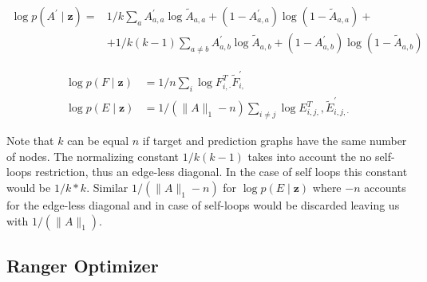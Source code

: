 {\begin{equation}
    \begin{split}
        \log p\left(A^{\prime} \mid \mathbf{z}\right) = &1 / k \sum_{a} A_{a, a}^{\prime} \log \widetilde{A}_{a, a}+\left(1-A_{a, a}^{\prime}\right) \log \left(1-\widetilde{A}_{a, a}\right)+ \\ & +1 / k(k-1) \sum_{a \neq b} A_{a, b}^{\prime} \log \widetilde{A}_{a, b}+\left(1-A_{a, b}^{\prime}\right) \log \left(1-\widetilde{A}_{a, b}\right)
    \end{split}
    \label{eq3:GAVElossA}
\end{equation}

\begin{align}
    \log p(F \mid \mathbf{z}) &=1 / n \sum_{i} \log F_{i, \cdot}^{T} \widetilde{F}_{i,}^{\prime} \\
    \log p(E \mid \mathbf{z}) &=1 /\left(\|A\|_{1}-n\right) \sum_{i \neq j} \log E_{i, j,}^{T}, \widetilde{E}_{i, j, \cdot}^{\prime}
    \label{eq3:GAVElossEF}
\end{align}

Note that $k$ can be equal $n$ if target and prediction graphs have the same number of nodes. The normalizing constant $1 / k(k-1)$ takes into account the no self-loops restriction, thus an edge-less diagonal. In the case of self loops this constant would be $1 / k*k$. Similar $1 /\left(\|A\|_{1}-n\right)$ for $\log p(E \mid \mathbf{z})$ where $-n$ accounts for the edge-less diagonal and in case of self-loops would be discarded leaving us with $1 /\left(\|A\|_{1}\right)$.

\subsection{Ranger Optimizer}
\label{sec3:ranger}

}
